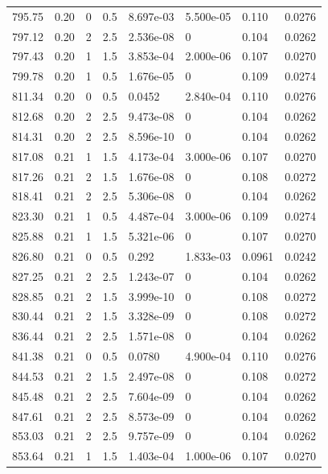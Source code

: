 \documentclass[preview]{standalone}
\begin{document}
{{{{{{\begin{tabular}{L{1.2cm}C{1.2cm} C{0.3cm}C{0.5cm} C{1.4cm}C{1.4cm} C{1.4cm}C{1.4cm}}
  795.75  &  0.20  & 0     & 0.5 &  8.697e-03  & 5.500e-05  & 0.110 &  0.0276   \\ 
  797.12  &  0.20  & 2     & 2.5 &  2.536e-08  & 0  & 0.104 &  0.0262   \\ 
  797.43  &  0.20  & 1     & 1.5 &  3.853e-04  & 2.000e-06  & 0.107 &  0.0270   \\ 
  799.78  &  0.20  & 1     & 0.5 &  1.676e-05  & 0  & 0.109 &  0.0274   \\ 
  811.34  &  0.20  & 0     & 0.5 &  0.0452  & 2.840e-04  & 0.110 &  0.0276   \\ 
  812.68  &  0.20  & 2     & 2.5 &  9.473e-08  & 0  & 0.104 &  0.0262   \\ 
  814.31  &  0.20  & 2     & 2.5 &  8.596e-10  & 0  & 0.104 &  0.0262   \\ 
  817.08  &  0.21  & 1     & 1.5 &  4.173e-04  & 3.000e-06  & 0.107 &  0.0270   \\ 
  817.26  &  0.21  & 2     & 1.5 &  1.676e-08  & 0  & 0.108 &  0.0272   \\ 
  818.41  &  0.21  & 2     & 2.5 &  5.306e-08  & 0  & 0.104 &  0.0262   \\ 
  823.30  &  0.21  & 1     & 0.5 &  4.487e-04  & 3.000e-06  & 0.109 &  0.0274   \\ 
  825.88  &  0.21  & 1     & 1.5 &  5.321e-06  & 0  & 0.107 &  0.0270   \\ 
  826.80  &  0.21  & 0     & 0.5 &  0.292  & 1.833e-03  & 0.0961 &  0.0242   \\ 
  827.25  &  0.21  & 2     & 2.5 &  1.243e-07  & 0  & 0.104 &  0.0262   \\ 
  828.85  &  0.21  & 2     & 1.5 &  3.999e-10  & 0  & 0.108 &  0.0272   \\ 
  830.44  &  0.21  & 2     & 1.5 &  3.328e-09  & 0  & 0.108 &  0.0272   \\ 
  836.44  &  0.21  & 2     & 2.5 &  1.571e-08  & 0  & 0.104 &  0.0262   \\ 
  841.38  &  0.21  & 0     & 0.5 &  0.0780  & 4.900e-04  & 0.110 &  0.0276   \\ 
  844.53  &  0.21  & 2     & 1.5 &  2.497e-08  & 0  & 0.108 &  0.0272   \\ 
  845.48  &  0.21  & 2     & 2.5 &  7.604e-09  & 0  & 0.104 &  0.0262   \\ 
  847.61  &  0.21  & 2     & 2.5 &  8.573e-09  & 0  & 0.104 &  0.0262   \\ 
  853.03  &  0.21  & 2     & 2.5 &  9.757e-09  & 0  & 0.104 &  0.0262   \\ 
  853.64  &  0.21  & 1     & 1.5 &  1.403e-04  & 1.000e-06  & 0.107 &  0.0270   \\ 

\end{tabular}}}}}}}
\end{document}
